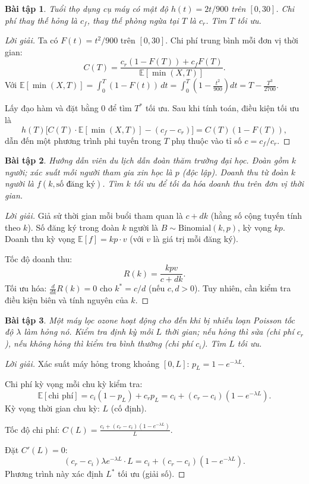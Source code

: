 \documentclass[8pt,a4paper]{article}
\newtheorem{exercise}{Bài tập}
\newenvironment{solution}{\begin{proof}[Lời giải]}{\end{proof}}
\newcommand{\E}{\mathbb{E}}
\begin{document}
\begin{exercise}
Tuổi thọ dụng cụ máy có mật độ $h(t) = 2t/900$ trên $[0, 30]$. Chi phí thay thế hỏng là $c_f$, thay thế phòng ngừa tại $T$ là $c_r$. Tìm $T$ tối ưu.
\end{exercise}
\begin{solution}
Ta có $F(t) = t^2/900$ trên $[0,30]$. Chi phí trung bình mỗi đơn vị thời gian:
\[
  C(T) = \frac{c_r(1 - F(T)) + c_f F(T)}{\E[\min(X,T)]}.
\]
Với $\E[\min(X,T)] = \int_0^T (1-F(t))\,dt = \int_0^T \left(1 - \frac{t^2}{900}\right)dt = T - \frac{T^3}{2700}$.

Lấy đạo hàm và đặt bằng 0 để tìm $T^*$ tối ưu. Sau khi tính toán, điều kiện tối ưu là
\[
  h(T)\bigl[C(T)\cdot\E[\min(X,T)] - (c_f - c_r)\bigr] = C(T)(1 - F(T)),
\]
dẫn đến một phương trình phi tuyến trong $T$ phụ thuộc vào tỉ số $c = c_f/c_r$.
\end{solution}

\begin{exercise}
Hướng dẫn viên du lịch dẫn đoàn thăm trường đại học. Đoàn gồm $k$ người; xác suất mỗi người tham gia xin học là $p$ (độc lập). Doanh thu từ đoàn $k$ người là $f(k, \text{số đăng ký})$. Tìm $k$ tối ưu để tối đa hóa doanh thu trên đơn vị thời gian.
\end{exercise}
\begin{solution}
Giả sử thời gian mỗi buổi tham quan là $c + dk$ (hằng số cộng tuyến tính theo $k$). Số đăng ký trong đoàn $k$ người là $B \sim \text{Binomial}(k, p)$, kỳ vọng $kp$. Doanh thu kỳ vọng $\E[f] = kp \cdot v$ (với $v$ là giá trị mỗi đăng ký).

Tốc độ doanh thu:
\[
  R(k) = \frac{kpv}{c + dk}.
\]
Tối ưu hóa: $\frac{d}{dk}R(k) = 0$ cho $k^* = c/d$ (nếu $c,d > 0$). Tuy nhiên, cần kiểm tra điều kiện biên và tính nguyên của $k$.
\end{solution}

\begin{exercise}
Một máy lọc ozone hoạt động cho đến khi bị nhiễu loạn Poisson tốc độ $\lambda$ làm hỏng nó. Kiểm tra định kỳ mỗi $L$ thời gian; nếu hỏng thì sửa (chi phí $c_r$), nếu không hỏng thì kiểm tra bình thường (chi phí $c_i$). Tìm $L$ tối ưu.
\end{exercise}
\begin{solution}
Xác suất máy hỏng trong khoảng $[0,L]$: $p_L = 1 - e^{-\lambda L}$.

Chi phí kỳ vọng mỗi chu kỳ kiểm tra:
\[
  \E[\text{chi phí}] = c_i(1 - p_L) + c_r p_L = c_i + (c_r - c_i)(1 - e^{-\lambda L}).
\]
Kỳ vọng thời gian chu kỳ: $L$ (cố định).

Tốc độ chi phí: $C(L) = \frac{c_i + (c_r - c_i)(1 - e^{-\lambda L})}{L}$.

Đặt $C'(L) = 0$:
\[
  (c_r - c_i)\lambda e^{-\lambda L} \cdot L = c_i + (c_r - c_i)(1 - e^{-\lambda L}).
\]
Phương trình này xác định $L^*$ tối ưu (giải số).
\end{solution}
\end{document}
